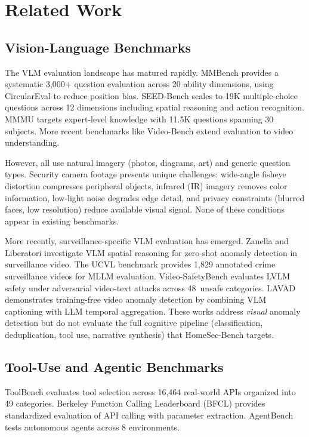 \documentclass[conference]{IEEEtran}
\begin{document}
\section{Related Work}

\subsection{Vision-Language Benchmarks}
The VLM evaluation landscape has matured rapidly. MMBench
\cite{liu2023mmbench} provides a systematic 3,000+ question evaluation
across 20 ability dimensions, using CircularEval to reduce position bias.
SEED-Bench \cite{li2023seedbench} scales to 19K multiple-choice questions
across 12 dimensions including spatial reasoning and action recognition.
MMMU \cite{yue2024mmmu} targets expert-level knowledge with 11.5K
questions spanning 30 subjects. More recent benchmarks like Video-Bench
\cite{ning2023videobench} extend evaluation to video understanding.

However, all use natural imagery (photos, diagrams, art) and generic
question types. Security camera footage presents unique challenges:
wide-angle fisheye distortion compresses peripheral objects, infrared
(IR) imagery removes color information, low-light noise degrades edge
detail, and privacy constraints (blurred faces, low resolution) reduce
available visual signal. None of these conditions appear in existing
benchmarks.

More recently, surveillance-specific VLM evaluation has emerged.
Zanella and Liberatori \cite{zanella2024vlmsurveillance} investigate
VLM spatial reasoning for zero-shot anomaly detection in surveillance
video. The UCVL benchmark \cite{wu2024ucvl} provides 1,829 annotated
crime surveillance videos for MLLM evaluation. Video-SafetyBench
\cite{yuan2024videosafety} evaluates LVLM safety under adversarial
video-text attacks across 48~unsafe categories. LAVAD
\cite{zanella2024lavad} demonstrates training-free video anomaly
detection by combining VLM captioning with LLM temporal aggregation.
These works address \emph{visual} anomaly detection but do not
evaluate the full cognitive pipeline (classification, deduplication,
tool use, narrative synthesis) that HomeSec-Bench targets.

\subsection{Tool-Use and Agentic Benchmarks}
ToolBench \cite{qin2023toolllm} evaluates tool selection across 16,464
real-world APIs organized into 49 categories. Berkeley Function Calling
Leaderboard (BFCL) \cite{berkeley2024bfcl} provides standardized
evaluation of API calling with parameter extraction. AgentBench
\cite{liu2023agentbench} tests autonomous agents across 8 environments.
\end{document}
